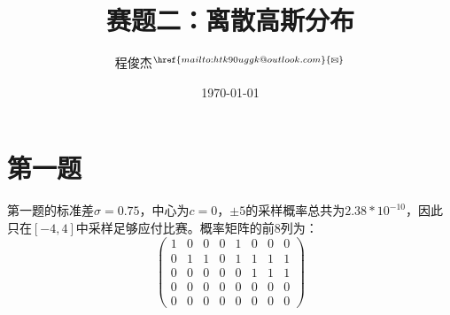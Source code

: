 \documentclass{article}
\title{赛题二：离散高斯分布}
\author{程俊杰$^{\href{mailto:htk90uggk@outlook.com}{\textrm{\Letter}}}$}
\date{\today}
\begin{document}
    \maketitle
    \section{第一题}
    第一题的标准差$\sigma = 0.75$，中心为$c = 0$，$\pm5$的采样概率总共为$2.38 * 10^{-10}$，因此只在$[-4, 4]$中采样足够应付比赛。概率矩阵的前8列为：
    \begin{equation}
        \begin{pmatrix}
            1 & 0 & 0 & 0 & 1 & 0 & 0 & 0 \\
            0 & 1 & 1 & 0 & 1 & 1 & 1 & 1 \\
            0 & 0 & 0 & 0 & 0 & 1 & 1 & 1 \\
            0 & 0 & 0 & 0 & 0 & 0 & 0 & 0 \\
            0 & 0 & 0 & 0 & 0 & 0 & 0 & 0
        \end{pmatrix}
    \end{equation}
    
\end{document}
